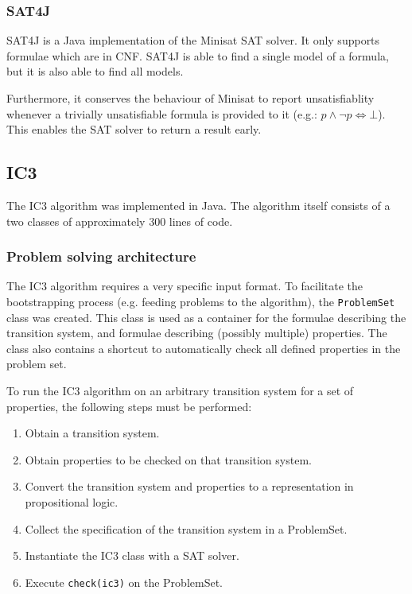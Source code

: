 \documentclass[a4paper]{article}
\begin{document}
\subsubsection{SAT4J}
SAT4J is a Java implementation of the Minisat SAT solver. It only supports formulae which are in CNF. SAT4J is able to find a single model of a formula, but it is also able to find all models.

Furthermore, it conserves the behaviour of Minisat to report unsatisfiablity whenever a trivially unsatisfiable formula is provided to it (e.g.: $p \land \lnot p \Leftrightarrow \bot$). This enables the SAT solver to return a result early.

\subsection{IC3}
The IC3 algorithm was implemented in Java. The algorithm itself consists of a two classes of approximately 300 lines of code.

\subsubsection{Problem solving architecture}
The IC3 algorithm requires a very specific input format. To facilitate the bootstrapping process (e.g. feeding problems to the algorithm), the \texttt{ProblemSet} class was created. This class is used as a container for the formulae describing the transition system, and formulae describing (possibly multiple) properties. The class also contains a shortcut to automatically check all defined properties in the problem set.

To run the IC3 algorithm on an arbitrary transition system for a set of properties, the following steps must be performed:
\begin{enumerate}
\item Obtain a transition system.
\item Obtain properties to be checked on that transition system.
\item Convert the transition system and properties to a representation in propositional logic.
\item Collect the specification of the transition system in a ProblemSet.
\item Instantiate the IC3 class with a SAT solver.
\item Execute \texttt{check(ic3)} on the ProblemSet.
\end{enumerate}
\end{document}
